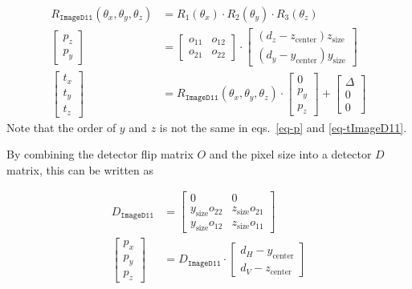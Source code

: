 \documentclass[12pt]{article}
\begin{document}
\begin{align}
  R_{\mathtt{ImageD11}}(\theta_x, \theta_y, \theta_z)
  & =
  R_1(\theta_x) \cdot R_2(\theta_y) \cdot R_3(\theta_z)
  \\
  \begin{bmatrix}
    p_z \\ p_y
  \end{bmatrix}
  & =
  \begin{bmatrix}
    o_{11} & o_{12}
    \\ o_{21} & o_{22}
  \end{bmatrix}
  \cdot
  \begin{bmatrix}
    (d_z - z_{\mathrm{center}}) z_{\mathrm{size}} \\
    (d_y - y_{\mathrm{center}}) y_{\mathrm{size}}
  \end{bmatrix}
  \label{eq-p}
  \\
  \begin{bmatrix}
    t_x \\ t_y \\ t_z
  \end{bmatrix}
  & =
  R_{\mathtt{ImageD11}}(\theta_x, \theta_y, \theta_z)
  \cdot
  \begin{bmatrix}
    0 \\ p_y \\ p_z
  \end{bmatrix}
  +
  \begin{bmatrix}
    \Delta \\ 0 \\ 0
  \end{bmatrix}
  \label{eq-tImageD11}
\end{align}
Note that the order of $y$ and $z$ is not the same in eqs.~\ref{eq-p}
and \ref{eq-tImageD11}.

By combining the detector flip matrix $O$ and the pixel size into a
detector $D$ matrix, this can be written as

\begin{align}
  D_{\mathtt{ImageD11}}
  & = 
  \begin{bmatrix}
    0 & 0 \\
    y_{\mathrm{size}} o_{22} & z_{\mathrm{size}} o_{21} \\
    y_{\mathrm{size}} o_{12} & z_{\mathrm{size}} o_{11}
  \end{bmatrix}
  \label{eq-DImageD11}
  \\
  \begin{bmatrix} p_x \\ p_y \\ p_z \end{bmatrix}
  & =
  D_{\mathtt{ImageD11}} \cdot
  \begin{bmatrix}
    d_H - y_{\mathrm{center}} \\
    d_V - z_{\mathrm{center}}
  \end{bmatrix}
\end{align}
\end{document}
